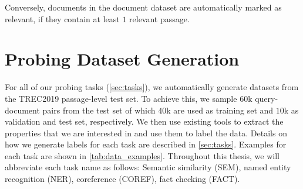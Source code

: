 Conversely, documents in the document dataset are automatically marked as relevant, if they contain at least $1$ relevant passage.

\section{Probing Dataset Generation}
\label{sec:dataset_gen}
For all of our probing tasks (\autoref{sec:tasks}), we automatically generate datasets from the TREC2019 passage-level test set. To achieve this, we sample $60$k query-document pairs from the test set of which $40$k are used as training set and $10$k as validation and test set, respectively. We then use existing tools to extract the properties that we are interested in and use them to label the data. Details on how we generate labels for each task are described in \autoref{sec:tasks}. Examples for each task are shown in \autoref{tab:data_examples}. Throughout this thesis, we will abbreviate each task name as follows: Semantic similarity (SEM), named entity recognition (NER), coreference (COREF), fact checking (FACT).

